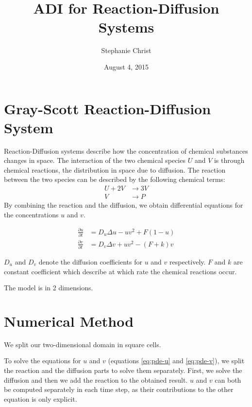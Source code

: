 \documentclass[a4paper]{article}
\title{ADI for Reaction-Diffusion Systems}
\author{Stephanie Christ}
\date{August 4, 2015}
\begin{document}

\maketitle


\section{Gray-Scott Reaction-Diffusion System}

Reaction-Diffusion systems describe how the concentration of chemical substances changes in space.
The interaction of the two chemical species $U$ and $V$ is through chemical reactions, the distribution in space due to diffusion.
The reaction between the two species can be described by the following chemical terms:
\begin{align*}
	U + 2V &\rightarrow 3V \\
	V &\rightarrow P
\end{align*}
By combining the reaction and the diffusion, we obtain differential equations for the concentrations $u$ and $v$.

\begin{align}
	\frac{\partial u}{\partial t} &= D_u \Delta u - uv^2 + F(1-u) \label{eq:pde-u}\\
	\frac{\partial v}{\partial t} &= D_v \Delta v + uv^2 - (F+k)v	 \label{eq:pde-v}
\end{align}

$D_u$ and $D_v$ denote the diffusion coefficients for $u$ and $v$ respectively.
$F$ and $k$ are constant coefficient which describe at which rate the chemical reactions occur.

The model is in 2 dimensions.



\section{Numerical Method}

We split our two-dimensional domain in square cells.

To solve the equations for $u$ and $v$ (equations \ref{eq:pde-u} and \ref{eq:pde-v}), we split the reaction and the diffusion parts to solve them separately.
First, we solve the diffusion and then we add the reaction to the obtained result.
$u$ and $v$ can both be computed separately in each time step, as their contributions to the other equation is only explicit.
\end{document}
